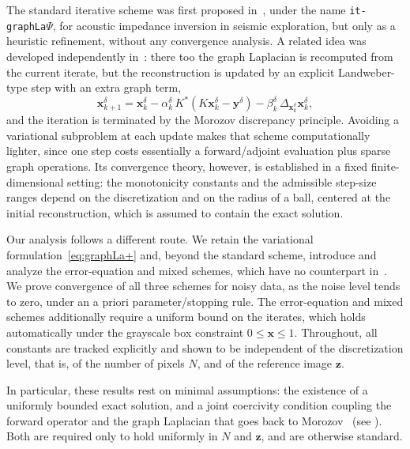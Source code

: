 \documentclass{article}
\theoremstyle{remark}
\newcommand{\bx}{{\bm{x}}}
\newcommand{\by}{{\bm{y}}}
\newcommand{\bz}{{\bm{z}}}
\begin{document}
The standard iterative scheme was first proposed in~\cite{bianchi2024improved}, under the name \texttt{it-graphLa}$\Psi$,
for acoustic impedance inversion in seismic exploration, but only as a heuristic
refinement, without any convergence analysis. A related idea was developed
independently in~\cite{bajpai2026convergence}: there too the graph Laplacian is
recomputed from the current iterate, but the reconstruction is updated by an
explicit Landweber-type step with an extra graph term,
\[
\bx_{k+1}^{\delta}
= \bx_k^{\delta}
- \alpha_k^{\delta}\, K^*\!\left(K\bx_k^{\delta} - \by^\delta\right)
- \beta_k^{\delta}\, \Delta_{\bx_k^{\delta}}\bx_k^{\delta},
\]
and the iteration is terminated by the Morozov discrepancy principle. Avoiding a
variational subproblem at each update makes that scheme computationally lighter,
since one step costs essentially a forward/adjoint evaluation plus sparse graph
operations. Its convergence theory, however, is established in a fixed
finite-dimensional setting: the monotonicity constants and the admissible
step-size ranges depend on the discretization and on the radius of a ball,
centered at the initial reconstruction, which is assumed to contain the exact
solution.

Our analysis follows a different route. We retain the variational
formulation~\cref{eq:graphLa+} and, beyond the standard scheme, introduce and
analyze the error-equation and mixed schemes, which have no counterpart
in~\cite{bianchi2024improved,bajpai2026convergence}. We prove convergence of all
three schemes for noisy data, as the noise level tends to zero, under an a priori
parameter/stopping rule. The error-equation and mixed schemes
additionally require a uniform bound on the iterates, which holds automatically
under the grayscale box constraint $0\leq\bx\leq 1$. Throughout, all constants are
tracked explicitly and shown to be independent of the discretization level, that
is, of the number of pixels $N$, and of the reference image $\bz$.

In particular, these
results rest on minimal assumptions: the existence of a uniformly bounded exact
solution, and a joint coercivity condition coupling the forward operator and the
graph Laplacian that goes back to
Morozov~\cite{morozov2012methods} (see ). Both are required only to hold uniformly in
$N$ and $\bz$, and are otherwise standard. 
\end{document}
